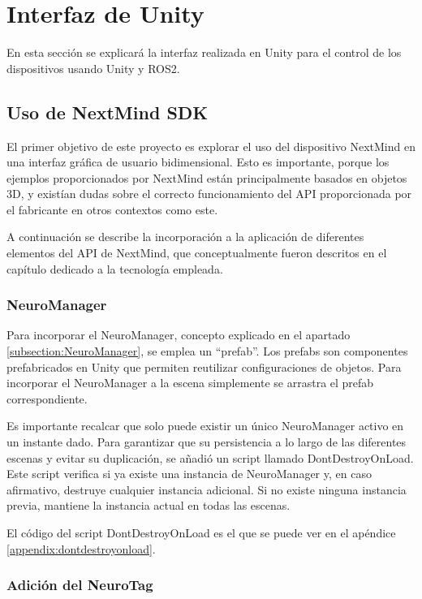 \section{Interfaz de Unity}

En esta sección se explicará la interfaz realizada en Unity para el control de los dispositivos usando Unity y ROS2.

\subsection{Uso de NextMind SDK}

El primer objetivo de este proyecto es explorar el uso del dispositivo NextMind en una interfaz gráfica de usuario bidimensional. Esto es importante, porque los ejemplos proporcionados por NextMind están principalmente basados en objetos 3D, y exist\'ian dudas sobre el correcto funcionamiento del API proporcionada por el fabricante en otros contextos como este.

A continuaci\'on se describe la incorporaci\'on a la aplicaci\'on de diferentes elementos del API de NextMind, que conceptualmente fueron descritos en el cap\'itulo dedicado a la tecnolog\'ia empleada.

\subsubsection{NeuroManager}

Para incorporar el NeuroManager, concepto explicado en el apartado \ref{subsection:NeuroManager}, se emplea un ``prefab''. Los prefabs son componentes prefabricados en Unity que permiten reutilizar configuraciones de objetos. Para incorporar el NeuroManager a la escena simplemente se arrastra el prefab correspondiente.



Es importante recalcar que solo puede existir un único NeuroManager activo en un instante dado. Para garantizar que su persistencia a lo largo de las diferentes escenas y evitar su duplicación, se añadió un script llamado DontDestroyOnLoad. Este script verifica si ya existe una instancia de NeuroManager y, en caso afirmativo, destruye cualquier instancia adicional. Si no existe ninguna instancia previa, mantiene la instancia actual en todas las escenas.



El código del script DontDestroyOnLoad es el que se puede ver en el apéndice \ref{appendix:dontdestroyonload}.

\subsubsection{Adición del NeuroTag}
\label{subsubsection:add-neurotag}

